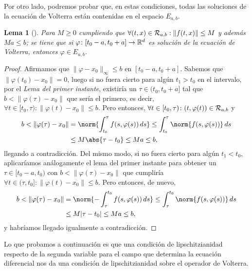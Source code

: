 \documentclass[11pt]{article}
\theoremstyle{plain}
\newtheorem{lemma}{Lema}
\theoremstyle{definition}
\theoremstyle{remark}
\begin{document}
Por otro lado, podremos probar que, en estas condiciones,
todas las soluciones de la ecuación de Volterra están contenidas
en el espacio $E_{a,b}$.

\begin{lemma}[]\label{lema-2-contr}
  Para \(M \geq 0\) cumpliendo que \(\forall (t,x)\in {{\cal{R}}}_{a,b} : \|f(t,x)\| \leq M\) y además
  \(Ma \leq b\); se tiene que si \(\varphi \colon [t_0-a,t_0+a] \to \mathbb{R}^d\) es solución
  de la ecuación de Volterra, entonces \(\varphi \in E_{a,b}\).
\end{lemma}
\begin{proof}
  Afirmamos que $\|\varphi-x_0\|_{\infty} \leq b$ en $[t_0-a,t_0+a]$. Sabemos que $\|\varphi(t_0) - x_0\| = 0$, luego
  si no fuera cierto para algún $t_1 > t_0$ en el intervalo, por el \textit{Lema del primer instante},
  existiría un $\tau \in (t_0,t_0+a]$ tal que $b<\|\varphi(\tau) - x_0\|$ que sería el primero,
  es decir, $\forall t \in [t_0,\tau)\colon \|\varphi(t)-x_0\| \leq b$. Pero entonces, $\forall t \in [t_0,\tau)\colon (t,\varphi(t)) \in {{\cal{R}}}_{a,b}$ y
  \[\begin{aligned}
   b < \|\varphi(\tau)-x_0\| &=
   \norm{\int_{t_0}^\tau f(s,\varphi(s))\,ds} \leq
   \int_{t_0}^\tau \norm{f(s,\varphi(s))} \,ds \\&\leq
   M\abs{\tau-t_0} \leq
   Ma \leq b,
 \end{aligned}\]
  llegando a contradicción. Del mismo modo, si no fuera cierto para algún $t_1 < t_0$,
  aplicaríamos análogamente el lema del primer instante para obtener un $\tau \in [t_0-a,t_0)$
  con $b < \| \varphi(\tau) - x_0 \|$ que cumpliría $\forall t \in (\tau,t_0]\colon \|\varphi(t)-x_0\| \leq b$.
  Pero entonces, de nuevo,
  \[\begin{aligned}
   b < \|\varphi(\tau)-x_0\| &=
   \norm{ -\int_{\tau}^{t_0} f(s,\varphi(s))\,ds } \leq
   \int^{t_0}_\tau \norm{ f(s,\varphi(s)) }\,ds \\&\leq
   M|\tau-t_0| \leq
   Ma \leq b,
   \end{aligned}\]
  y habríamos llegado igualmente a contradicción.
\end{proof}

Lo que probamos a continuación es que una condición de lipschitzianidad respecto
de la segunda variable para el campo que determina la ecuación diferencial nos
da una condición de lipschitzianidad sobre el operador de Volterra.
\end{document}
